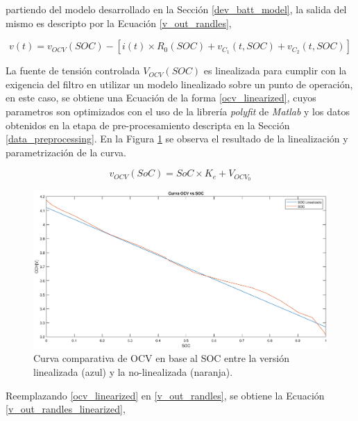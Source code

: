 \documentclass[10pt,a4paper]{article}
\begin{document}
partiendo del modelo desarrollado en la Secci\'on \ref{dev_batt_model}, la
salida del mismo es descripto por la Ecuaci\'on \ref{v_out_randles},

\begin{equation}
    v(t) = v_{OCV}(SOC) - \left[i(t) \times R_0\left(SOC\right)  + v_{C_1}\left(t,
    SOC\right) + v_{C_2}\left(t, SOC\right)\right] \label{v_out_randles}
\end{equation}

\noindent La fuente de tensión controlada $V_{OCV}(SOC)$ es linealizada para 
cumplir con la exigencia del filtro en utilizar un modelo linealizado sobre un
punto de operaci\'on, en este caso, se obtiene una Ecuaci\'on de la forma
\ref{ocv_linearized}, cuyos parametros son optimizados con el uso de la
librer\'ia \emph{polyfit} de \emph{Matlab} y los datos obtenidos en la etapa de
pre-procesamiento descripta en la Secci\'on \ref{data_preprocessing}. En la 
Figura \ref{soc_linealized} se observa el resultado de la linealizaci\'on y
parametrizaci\'on de la curva.

\begin{equation}
    v_{OCV}(SoC) = SoC \times K_e + V_{OCV_0} 
    \label{ocv_linearized}
\end{equation}

\begin{figure}[h!]
    \begin{center}
	\includegraphics[width=1\textwidth]{SOC_vs_OCV.eps}
    \caption{Curva comparativa de \acrshort{OCV} en base al \acrshort{SOC} 
    entre la versi\'on linealizada (azul) y la no-linealizada (naranja).} 
	\label{soc_linealized}
    \end{center}
\end{figure}
\FloatBarrier

Reemplazando \ref{ocv_linearized} en \ref{v_out_randles}, se obtiene la
Ecuaci\'on \ref{v_out_randles_linearized},
\end{document}
